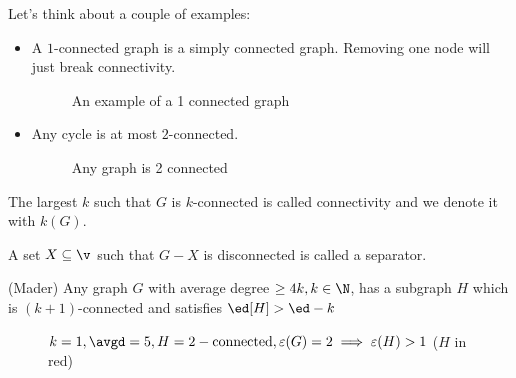 Let's think about a couple of examples:
\begin{itemize}
    \item A $1$-connected graph is a simply connected graph. Removing one node will just break connectivity.
    \begin{figure}[h]
        \centering
        
        \label{fig:1_connected_graph_example}
        \caption{An example of a 1 connected graph}
    \end{figure}
    \item Any cycle is at most $2$-connected.
    \begin{figure}[h]
        \centering
        
        \label{fig:2_connected_example}
        \caption{Any graph is 2 connected}
    \end{figure}
\end{itemize}
The largest $k$ such that $G$ is $k$-connected is called connectivity and we denote it with $k(G)$.
\begin{definition}[Separator]
    A set $X \subseteq \v$ such that $G - X$ is disconnected is called a separator.
\end{definition}
\begin{customtheorem}{(Mader)}
    \label{theorem:mader}
    Any graph $G$ with average degree $\geq 4k, k \in \N$, has a subgraph $H$ which is $(k + 1)$-connected and satisfies $\ed[H] > \ed - k$
\end{customtheorem}
\begin{figure}[h]
    \centering
    
    \label{fig:mader_proof}
    \caption{$k = 1, \avgd = 5, H = 2-\text{connected}, \varepsilon(G) = 2 \implies \varepsilon(H)> 1$ ($H$ in red)}
\end{figure}
